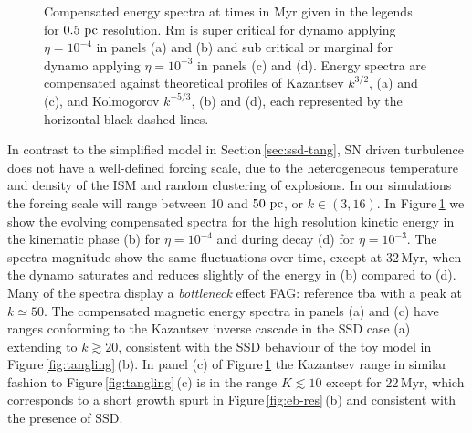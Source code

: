 \documentclass[preprint2]{aastex63}
\newcommand\pc{~ {\rm pc}}
\newcommand{\fag}[1]{\textcolor{midgreen}{FAG: #1}}
\begin{document}
\begin{figure*}
\caption{
Compensated energy spectra at times in Myr given in the legends for 
$0.5\pc$ resolution.
Rm is super critical for dynamo applying $\eta=10^{-4}$ in
panels (a) and (b) and sub critical or marginal for dynamo applying
$\eta=10^{-3}$ in panels (c) and (d).
Energy spectra are compensated against theoretical profiles of Kazantsev
$k^{3/2}$, (a) and (c), and Kolmogorov $k^{-5/3}$, (b) and (d), 
each represented by the horizontal black dashed lines.
\label{fig:4power}}
\end{figure*}

In contrast to the simplified model in Section\,\ref{sec:ssd-tang}, SN driven
turbulence does not have a well-defined forcing scale, due to the heterogeneous
temperature and density of the ISM and random clustering of explosions.
In our simulations the forcing scale will range between 10 and $50\pc$,
or $k\in(3,16)$.
In Figure\,\ref{fig:4power} we show the evolving compensated spectra for the
high resolution kinetic energy in the kinematic phase (b) for $\eta=10^{-4}$
and during decay (d) for $\eta=10^{-3}$.
The spectra magnitude show the same fluctuations over time, except at 32\,Myr,
when the dynamo saturates and reduces slightly of the energy in (b) compared
to (d). 
Many of the spectra display a \emph{bottleneck} effect \fag{reference tba} with
a peak at $k\simeq50$.
The compensated magnetic energy spectra in panels (a) and (c) have ranges 
conforming to the Kazantsev inverse cascade in the SSD case (a) extending to
$k\gtrsim 20$, consistent with the SSD behaviour of the toy model in
Figure\,\ref{fig:tangling}\,(b).
In panel (c) of Figure\,\ref{fig:4power} the Kazantsev range in similar fashion
to Figure\,\ref{fig:tangling}\,(c) is in the range $K\lesssim10$ except
for 22\,Myr, which corresponds to a short growth spurt in
Figure\,\ref{fig:eb-res}\,(b) and consistent with the presence of SSD.
\end{document}
